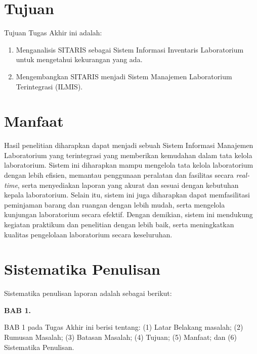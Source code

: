 \section{Tujuan}
Tujuan Tugas Akhir ini adalah:
\begin{enumerate}
	\item Menganalisis SITARIS sebagai Sistem Informasi Inventaris Laboratorium untuk mengetahui kekurangan yang ada.
	\item Mengembangkan SITARIS menjadi Sistem Manajemen Laboratorium Terintegrasi (ILMIS).
\end{enumerate}

\section{Manfaat}
Hasil penelitian diharapkan dapat menjadi sebuah Sistem Informasi Manajemen Laboratorium yang terintegrasi yang memberikan kemudahan dalam tata kelola laboratorium. Sistem ini diharapkan mampu mengelola tata kelola laboratorium dengan lebih efisien, memantau penggunaan peralatan dan fasilitas secara \textit{real-time}, serta menyediakan laporan yang akurat dan sesuai dengan kebutuhan kepala laboratorium. Selain itu, sistem ini juga diharapkan dapat memfasilitasi peminjaman barang dan ruangan dengan lebih mudah, serta mengelola kunjungan laboratorium secara efektif. Dengan demikian, sistem ini mendukung kegiatan praktikum dan penelitian dengan lebih baik, serta meningkatkan kualitas pengelolaan laboratorium secara keseluruhan.
\section{Sistematika Penulisan}
Sistematika penulisan laporan adalah sebagai berikut:

\textbf{BAB 1. \babSatu}

BAB 1 pada Tugas Akhir ini berisi tentang: (1) Latar Belakang masalah; (2) Rumusan Masalah; (3) Batasan Masalah; (4) Tujuan; (5) Manfaat; dan (6) Sistematika Penulisan.

